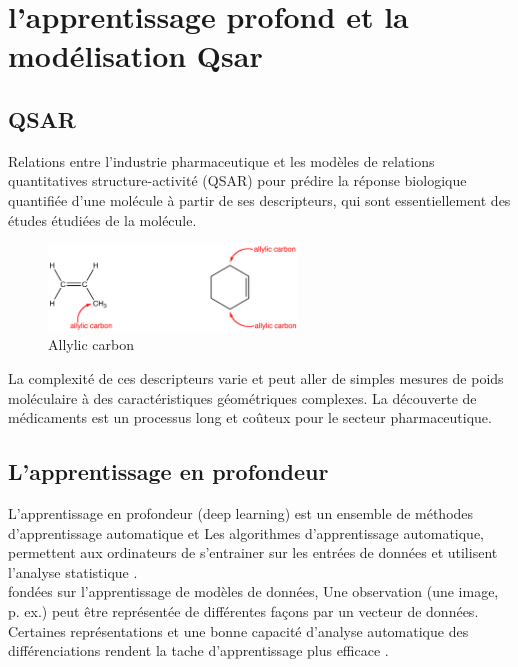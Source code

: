 \documentclass[12pt]{report}
\begin{document}
\section{l'apprentissage profond et la modélisation Qsar}
\subsection{QSAR}
Relations entre l'industrie pharmaceutique et les modèles de relations quantitatives structure-activité (QSAR) pour prédire la réponse biologique quantifiée d'une molécule à partir de ses descripteurs, qui sont essentiellement des études étudiées de la molécule.

\begin{figure}[h]
\begin{center}
\includegraphics[width=250]{qsar.png} 
\caption{Allylic carbon}
\label{Allylic carbon}
\end{center}
\end{figure}
 
La complexité de ces descripteurs varie et peut aller de simples mesures de poids moléculaire à des caractéristiques géométriques complexes. La découverte de médicaments est un processus long et coûteux pour le secteur pharmaceutique.
\subsection{L'apprentissage en profondeur}
L'apprentissage en profondeur (deep learning) est un ensemble de méthodes d'apprentissage automatique et Les algorithmes d'apprentissage automatique, permettent aux ordinateurs de s'entrainer sur les entrées de données et utilisent l'analyse statistique .\\
fondées sur l'apprentissage de modèles de données, Une observation (une image, p. ex.) peut être représentée de différentes façons par un vecteur de données. Certaines représentations et une bonne capacité d'analyse automatique des différenciations rendent la tache d'apprentissage plus efficace \cite{ref22}.
\end{document}

